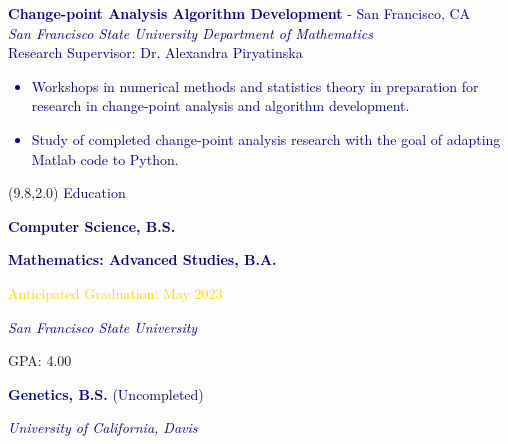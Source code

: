 \documentclass[hidelinks, 10pt]{article}
\newcommand{\bodyspacing}{1mm}
\begin{document}
\begin{textblock}{9}
\vspace{\bodyspacing}

\textcolor{navy}{{\textbf{Change-point Analysis Algorithm Development} - San Francisco, CA}\\
\emph{San Francisco State University Department of Mathematics}\\
Research Supervisor: Dr. Alexandra Piryatinska
    \begin{itemize}[leftmargin=5mm]
        \setlength\itemsep{-0.25em}
        \item Workshops in numerical methods and statistics theory in
        preparation for research in change-point analysis and algorithm
        development.
        \item Study of completed change-point analysis research with the goal of
        adapting Matlab code to Python.
    \end{itemize}}
\end{textblock}


\begin{textblock}{4}(9.8,2.0)
	\setlength{\parindent}{0cm}
    \large{\textcolor{navy}{Education}}

	\vspace{4mm}

	\footnotesize\textcolor{navy}{\scriptsize\textbf{Computer Science, B.S.}}

	\vspace{0.5mm}

	\footnotesize\textcolor{navy}{\scriptsize\textbf{Mathematics: Advanced Studies, B.A.}}

	\vspace{0.5mm}

	\scriptsize\textcolor{gold}{\scriptsize Anticipated Graduation: May 2023}

	\vspace{0.5mm}

	\scriptsize\textcolor{navy}{\scriptsize\emph{San Francisco State University}}

	\vspace{0.5mm}

	\scriptsize{\scriptsize GPA: 4.00}

	\vspace{4mm}

	\footnotesize\textcolor{navy}{\scriptsize\textbf{Genetics, B.S.} (Uncompleted)}

	\vspace{0.5mm}

	\scriptsize\textcolor{navy}{\scriptsize\emph{University of California, Davis}}
\end{textblock}
\end{document}
